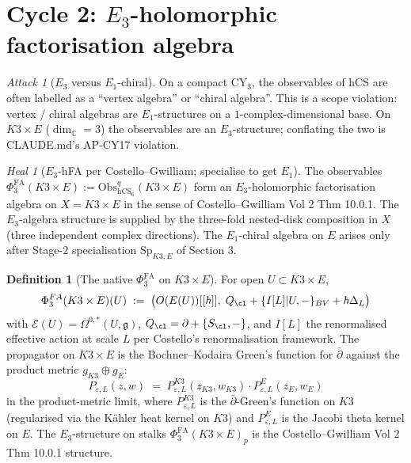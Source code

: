 \documentclass[11pt]{amsart}
\providecommand{\C}{\mathbb{C}}
\providecommand{\cE}{\mathcal{E}}
\providecommand{\cO}{\mathcal{O}}
\providecommand{\dbar}{\bar{\partial}}
\providecommand{\g}{\mathfrak{g}}
\providecommand{\Obs}{\mathrm{Obs}}
\providecommand{\hCS}{\mathrm{hCS}}
\providecommand{\BV}{\mathrm{BV}}
\providecommand{\PhiFA}{\Phi^{\mathrm{FA}}}
\providecommand{\SpF}{\mathrm{Sp}}
\theoremstyle{plain}
\theoremstyle{definition}
\newtheorem{definition}[theorem]{Definition}
\theoremstyle{remark}
\newtheorem{attack}[theorem]{Attack}
\newtheorem{heal}[theorem]{Heal}
\begin{document}
\section{Cycle 2: $E_{3}$-holomorphic factorisation algebra}

\begin{attack}[$E_{3}$ versus $E_{1}$-chiral]\label{atk:2}
On a compact CY$_{3}$, the observables of hCS are often labelled as a
``vertex algebra'' or ``chiral algebra''. This is a scope violation:
vertex / chiral algebras are $E_{1}$-structures on a $1$-complex-dimensional
base. On $K3\times E$ ($\dim_{\C}=3$) the observables are an
$E_{3}$-structure; conflating the two is CLAUDE.md's AP-CY17 violation.
\end{attack}

\begin{heal}[$E_{3}$-hFA per Costello--Gwilliam; specialise to get
$E_{1}$]\label{heal:2}
The observables $\PhiFA_{3}(K3\times E) := \Obs^{q}_{\hCS_{6}}(K3\times
E)$ form an $E_{3}$-holomorphic factorisation algebra on $X = K3\times
E$ in the sense of Costello--Gwilliam Vol 2 Thm 10.0.1. The
$E_{3}$-algebra structure is supplied by the three-fold nested-disk
composition in $X$ (three independent complex directions). The
$E_{1}$-chiral algebra on $E$ arises only after Stage-$2$
specialisation $\SpF_{K3,E}$ of Section 3.
\end{heal}

\begin{definition}[The native $\PhiFA_{3}$ on $K3\times E$]
\label{def:PhiFA-K3E}
For open $U \subset K3\times E$,
\[
\PhiFA_{3}(K3\times E)(U) \;:=\; \bigl(\cO(\cE(U))[[\hbar]],\;
Q_{\cl} + \{I[L] | U, -\}_{\BV} + \hbar \Delta_{L}\bigr)
\]
with $\cE(U) = \Omega^{0,\ast}(U, \g)$, $Q_{\cl} = \dbar + \{S_{\cl}, -\}$,
and $I[L]$ the renormalised effective action at scale $L$ per
Costello's renormalisation framework. The propagator on $K3\times E$
is the Bochner--Kodaira Green's function for $\dbar$ against the product
metric $g_{K3}\oplus g_{E}$:
\begin{equation}\label{eq:prop-K3E}
P_{\varepsilon,L}(z,w) \;=\; P^{K3}_{\varepsilon,L}(z_{K3}, w_{K3})
\cdot P^{E}_{\varepsilon,L}(z_{E}, w_{E})
\end{equation}
in the product-metric limit, where $P^{K3}_{\varepsilon,L}$ is the
$\dbar$-Green's function on $K3$ (regularised via the K\"ahler heat
kernel on $K3$) and $P^{E}_{\varepsilon,L}$ is the Jacobi theta kernel
on $E$. The $E_{3}$-structure on stalks
$\PhiFA_{3}(K3\times E)_{p}$ is the Costello--Gwilliam Vol 2 Thm 10.0.1
structure.
\end{definition}
\end{document}
